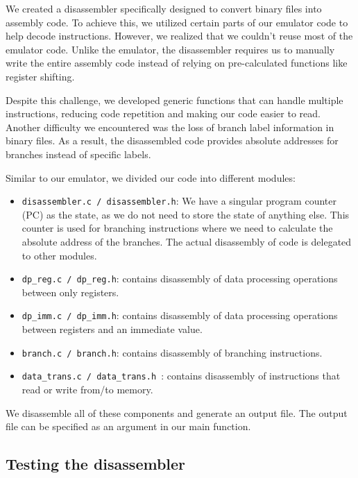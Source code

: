 \documentclass{article}
\begin{document}
\begin{adjustwidth}{2em}{0pt}
            We created a disassembler specifically designed to convert binary files into assembly code. To achieve this, we utilized certain parts of our emulator code to help decode instructions. However, we realized that we couldn't reuse most of the emulator code. Unlike the emulator, the disassembler requires us to manually write the entire assembly code instead of relying on pre-calculated functions like register shifting.
            
            Despite this challenge, we developed generic functions that can handle multiple instructions, reducing code repetition and making our code easier to read. Another difficulty we encountered was the loss of branch label information in binary files. As a result, the disassembled code provides absolute addresses for branches instead of specific labels. 
        
            Similar to our emulator, we divided our code into different modules: 
            \begin{itemize}
                \item \texttt{disassembler.c / disassembler.h}: 
               We have a singular program counter (PC) as the state, as we do not need to store the state of anything else. This counter is used for branching instructions where we need to calculate the absolute address of the branches. The actual disassembly of code is delegated to other modules.
                \item  \texttt{dp\_reg.c / dp\_reg.h}: contains disassembly of data processing operations between only registers.
                \item \texttt{dp\_imm.c / dp\_imm.h}: contains disassembly of data processing operations between registers and an immediate value.
                \item \texttt{branch.c / branch.h}: contains disassembly of branching instructions.
                \item \texttt{data\_trans.c / data\_trans.h }: contains disassembly of instructions that read or write from/to memory.
            \end{itemize}
        
        
            We disassemble all of these components and generate an output file. The output file can be specified as an argument in our main function.
        
        \subsection{Testing the disassembler}
        

\end{adjustwidth}
\end{document}
